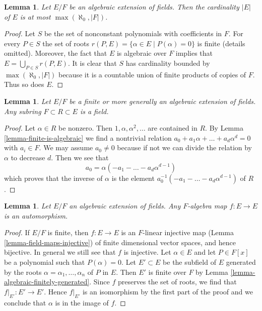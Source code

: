 \documentclass{stacks-project}
\theoremstyle{plain}
\newtheorem{lemma}[subsection]{Lemma}
\theoremstyle{definition}
\theoremstyle{remark}
\numberwithin{equation}{subsection}
\begin{document}
\begin{lemma}
\label{lemma-size-algebraic-extension}
Let $E/F$ be an algebraic extension of fields. Then the cardinality $|E|$
of $E$ is at most $\max(\aleph_0, |F|)$.
\end{lemma}

\begin{proof}
Let $S$ be the set of nonconstant polynomials with coefficients in $F$.
For every $P \in S$ the set of roots
$r(P, E) = \{\alpha \in E \mid P(\alpha) = 0\}$
is finite (details omitted). Moreover, the fact that $E$ is algebraic
over $F$ implies that $E = \bigcup_{P \in S} r(P, E)$.
It is clear that $S$ has cardinality bounded by $\max(\aleph_0, |F|)$
because it is a countable union of finite products of copies of $F$.
Thus so does $E$.
\end{proof}

\begin{lemma}
\label{lemma-subalgebra-algebraic-extension-field}
Let $E/F$ be a finite or more generally an algebraic extension of fields.
Any subring $F \subset R \subset E$ is a field.
\end{lemma}

\begin{proof}
Let $\alpha \in R$ be nonzero. Then $1, \alpha, \alpha^2, \ldots$
are contained in $R$. By Lemma \ref{lemma-finite-is-algebraic}
we find a nontrivial relation
$a_0 + a_1 \alpha + \ldots + a_d \alpha^d = 0$ with $a_i \in F$.
We may assume $a_0 \not = 0$ because if not we can divide the relation
by $\alpha$ to decrease $d$. Then we see that
$$
a_0 = \alpha (- a_1  - \ldots - a_d \alpha^{d - 1})
$$
which proves that the inverse of $\alpha$ is the element
$a_0^{-1} (- a_1  - \ldots - a_d \alpha^{d - 1})$
of $R$.
\end{proof}

\begin{lemma}
\label{lemma-algebraic-extension-self-map}
Let $E/F$ an algebraic extension of fields. Any $F$-algebra map
$f : E \to E$ is an automorphism.
\end{lemma}

\begin{proof}
If $E/F$ is finite, then $f : E \to E$ is an $F$-linear
injective map (Lemma \ref{lemma-field-maps-injective})
of finite dimensional vector spaces, and hence bijective.
In general we still see that $f$ is injective.
Let $\alpha \in E$ and let $P \in F[x]$ be a
polynomial such that $P(\alpha) = 0$.
Let $E' \subset E$ be the subfield of $E$ generated
by the roots $\alpha = \alpha_1, \ldots, \alpha_n$ of $P$ in $E$.
Then $E'$ is finite over $F$ by Lemma \ref{lemma-algebraic-finitely-generated}.
Since $f$ preserves the set of roots, we find that
$f|_{E'} : E' \to E'$. Hence $f|_{E'}$ is an isomorphism
by the first part of the proof and we conclude that $\alpha$
is in the image of $f$.
\end{proof}
\end{document}
